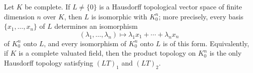 Let $K$ be complete. If $L \neq \{0\}$ is a Hausdorff topological vector space of finite dimension $n$ over $K$, then $L$ is isomorphic with $K_0^n$; more precisely, every basis $\{x_1, \ldots, x_n\}$ of $L$ determines an isomorphism
$$(\lambda_1, \ldots, \lambda_n) \mapsto \lambda_1 x_1 + \cdots + \lambda_n x_n$$
of $K_0^n$ onto $L$, and every isomorphism of $K_0^n$ onto $L$ is of this form. Equivalently, if $K$ is a complete valuated field, then the product topology on $K_0^n$ is the only Hausdorff topology satisfying $(LT)_1$ and $(LT)_2$.
